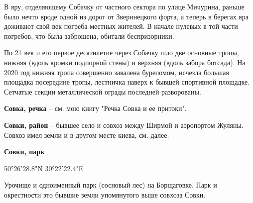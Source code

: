 В яру, отделяющему Собачку от частного сектора по улице Мичурина, раньше было нечто вроде одной из дорог от Зверинецкого форта, а теперь в берегах яра доживают свой век погреба местных жителей. В начале нулевых в той части погребов, что была заброшена, обитали беспризорники.

По 21 век и его первое десятилетие через Собачку шло две основные тропы, нижняя (вдоль кромки подпорной стены) и верхняя (вдоль забора ботсада). На 2020 год нижняя тропа совершенно завалена буреломом, исчезла большая площадка посередине тропы, лестничка наверх к бывшей спортивной площадке. Сетчатые секции металлической ограды последней разворованы.\\

\medskip

\textbf{Совка, речка} – см. мою книгу "Речка Совка и ее притоки".\\

\medskip

\textbf{Совки, район} – бывшее село и совхоз между Ширмой и аэропортом Жуляны. Совхоз имел земли и в другом месте киева, см. далее.\\

\medskip

\textbf{Совки, парк}

50°26'28.8"N 30°22'22.4"E

Урочище и одноименный парк (сосновый лес) на Борщаговке. Парк и окрестности это бывшие земли упомянутого выше совхоза Совки.

\medskip





